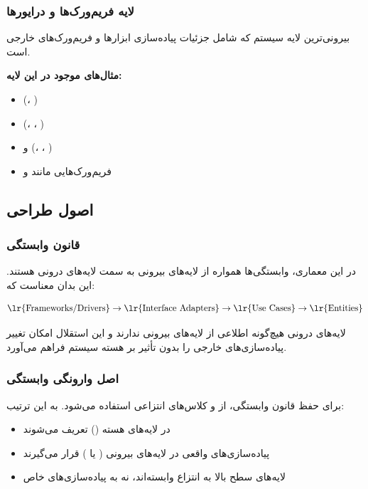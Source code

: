 \subsubsection{لایه فریم‌ورک‌ها و درایورها }

بیرونی‌ترین لایه سیستم که شامل جزئیات پیاده‌سازی ابزارها و فریم‌ورک‌های خارجی است.

\noindent
\textbf{مثال‌های موجود در این لایه:}
\begin{itemize}
    \item {} (، )
    \item {} (، ، )
    \item {} و  (، ، )
    \item فریم‌ورک‌هایی مانند  و 
\end{itemize}

\subsection{اصول طراحی}

\subsubsection{قانون وابستگی }

در این معماری، وابستگی‌ها همواره از لایه‌های بیرونی به سمت لایه‌های درونی هستند. این بدان معناست که:

\begin{equation}
\text{\lr{Frameworks/Drivers}} \rightarrow \text{\lr{Interface Adapters}} \rightarrow \text{\lr{Use Cases}} \rightarrow \text{\lr{Entities}}
\end{equation}

\noindent
لایه‌های درونی هیچ‌گونه اطلاعی از لایه‌های بیرونی ندارند و این استقلال امکان تغییر پیاده‌سازی‌های خارجی را بدون تأثیر بر هسته سیستم فراهم می‌آورد.

\subsubsection{اصل وارونگی وابستگی }

برای حفظ قانون وابستگی، از  و کلاس‌های انتزاعی استفاده می‌شود. به این ترتیب:

\begin{itemize}
    \item {} در لایه‌های هسته () تعریف می‌شوند
    \item پیاده‌سازی‌های واقعی در لایه‌های بیرونی ( یا ) قرار می‌گیرند
    \item لایه‌های سطح بالا به انتزاع وابسته‌اند، نه به پیاده‌سازی‌های خاص
\end{itemize}

